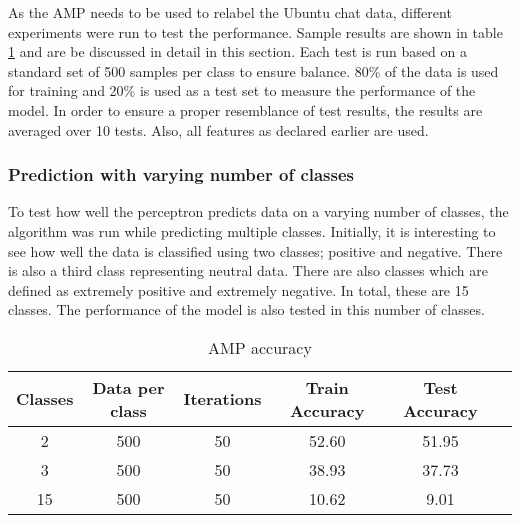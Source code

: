 
\begin{comment}
Experiments / Empirical evaluation (roughly 2-3 pages)
• Any details about experiments (dataset sizes, parameter selection, etc)
• Results
• Analysis (discussion of results / visualization / findings / etc)
\end{comment}

As the AMP needs to be used to relabel the Ubuntu chat data, different experiments were run to test the performance. Sample results are shown in table \ref{table:AMPaccuracy} and are be discussed in detail in this section. Each test is run based on a standard set of 500 samples per class to ensure balance. 80\% of the data is used for training and 20\% is used as a test set to measure the performance of the model. In order to ensure a proper resemblance of test results, the results are averaged over 10 tests. Also, all features as declared earlier are used.

\subsubsection{Prediction with varying number of classes}
To test how well the perceptron predicts data on a varying number of classes, the algorithm was run while predicting multiple classes. Initially, it is interesting to see how well the data is classified using two classes; positive and negative. There is also a third class representing neutral data. There are also classes which are defined as extremely positive and extremely negative. In total, these are 15 classes. The performance of the model is also tested in this number of classes. 

\begin{table}[h!]
\begin{center}
\begin{tabular}{| c | c | c | c | c | c |}
\hline
 {\textbf{Classes}} 	 
 & {\textbf{Data per class}} 					& {\textbf{Iterations}} 
 & {\textbf{Train Accuracy}} 					& {\textbf{Test Accuracy}} 
 \\
\hline
2	&	500	&	50	&	52.60	& 	51.95	\\
3	&	500	&	50	&	38.93	&	37.73	\\
15	&	500	&	50	&	10.62	&	9.01		\\
\hline
\end{tabular}
\caption{AMP accuracy}
\label{table:AMPaccuracy}
\end{center}
\end{table}

